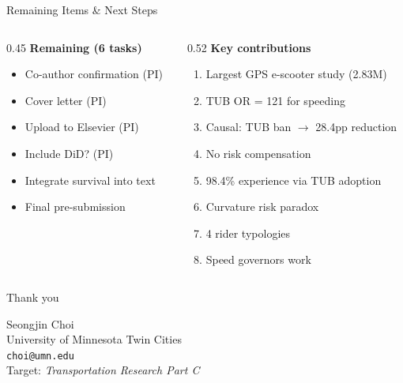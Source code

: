 \documentclass[aspectratio=169, 11pt]{beamer}
\begin{document}
\begin{frame}{Remaining Items \& Next Steps}
\begin{columns}[T]
\begin{column}{0.45\textwidth}
\textbf{Remaining (6 tasks)}
\begin{itemize}
\item[\faIcon{user}] Co-author confirmation (PI)
\item[\faIcon{envelope}] Cover letter (PI)
\item[\faIcon{upload}] Upload to Elsevier (PI)
\item[\faIcon{question-circle}] Include DiD? (PI)
\item[\faIcon{file-alt}] Integrate survival into text
\item[\faIcon{check-double}] Final pre-submission
\end{itemize}
\end{column}
\begin{column}{0.52\textwidth}
\textbf{Key contributions}
\begin{enumerate}
\item Largest GPS e-scooter study (2.83M)
\item TUB OR = 121 for speeding
\item Causal: TUB ban $\to$ 28.4pp reduction
\item No risk compensation
\item 98.4\% experience via TUB adoption
\item Curvature risk paradox
\item 4 rider typologies
\item Speed governors work
\end{enumerate}
\end{column}
\end{columns}
\end{frame}

\begin{frame}[standout]
\Large Thank you

\vspace{0.5cm}
\normalsize
Seongjin Choi\\
\footnotesize
University of Minnesota Twin Cities\\
\texttt{choi@umn.edu}\\
\vspace{0.3cm}
\normalsize
Target: \textit{Transportation Research Part C}
\end{frame}
\end{document}
